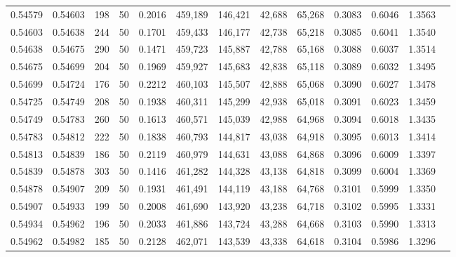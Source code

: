 \begin{tabular}{rrrrrrrrrrrrr}
0.54579 & 0.54603 &   198 &  50 &                                     0.2016 & 459,189 & 146,421 &  42,688 &  65,268 & 0.3083 & 0.6046 & 1.3563 \\
0.54603 & 0.54638 &   244 &  50 &                                     0.1701 & 459,433 & 146,177 &  42,738 &  65,218 & 0.3085 & 0.6041 & 1.3540 \\
0.54638 & 0.54675 &   290 &  50 &                                     0.1471 & 459,723 & 145,887 &  42,788 &  65,168 & 0.3088 & 0.6037 & 1.3514 \\
0.54675 & 0.54699 &   204 &  50 &                                     0.1969 & 459,927 & 145,683 &  42,838 &  65,118 & 0.3089 & 0.6032 & 1.3495 \\
0.54699 & 0.54724 &   176 &  50 &                                     0.2212 & 460,103 & 145,507 &  42,888 &  65,068 & 0.3090 & 0.6027 & 1.3478 \\
0.54725 & 0.54749 &   208 &  50 &                                     0.1938 & 460,311 & 145,299 &  42,938 &  65,018 & 0.3091 & 0.6023 & 1.3459 \\
0.54749 & 0.54783 &   260 &  50 &                                     0.1613 & 460,571 & 145,039 &  42,988 &  64,968 & 0.3094 & 0.6018 & 1.3435 \\
0.54783 & 0.54812 &   222 &  50 &                                     0.1838 & 460,793 & 144,817 &  43,038 &  64,918 & 0.3095 & 0.6013 & 1.3414 \\
0.54813 & 0.54839 &   186 &  50 &                                     0.2119 & 460,979 & 144,631 &  43,088 &  64,868 & 0.3096 & 0.6009 & 1.3397 \\
0.54839 & 0.54878 &   303 &  50 &                                     0.1416 & 461,282 & 144,328 &  43,138 &  64,818 & 0.3099 & 0.6004 & 1.3369 \\
0.54878 & 0.54907 &   209 &  50 &                                     0.1931 & 461,491 & 144,119 &  43,188 &  64,768 & 0.3101 & 0.5999 & 1.3350 \\
0.54907 & 0.54933 &   199 &  50 &                                     0.2008 & 461,690 & 143,920 &  43,238 &  64,718 & 0.3102 & 0.5995 & 1.3331 \\
0.54934 & 0.54962 &   196 &  50 &                                     0.2033 & 461,886 & 143,724 &  43,288 &  64,668 & 0.3103 & 0.5990 & 1.3313 \\
0.54962 & 0.54982 &   185 &  50 &                                     0.2128 & 462,071 & 143,539 &  43,338 &  64,618 & 0.3104 & 0.5986 & 1.3296 \\

\end{tabular}
